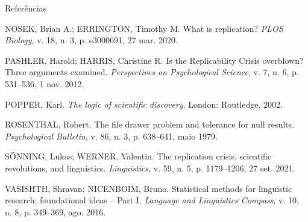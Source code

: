 \documentclass[numbering=fraction,aspectratio=169]{beamer}
\begin{document}
\begin{frame}[allowframebreaks]{Referências}
\begin{thebibliography}{9}
    NOSEK, Brian A.; ERRINGTON, Timothy M. What is replication? \emph{PLOS Biology}, v. 18, n. 3, p. e3000691, 27 mar. 2020.

    PASHLER, Harold; HARRIS, Christine R. Is the Replicability Crisis overblown? Three arguments examined. \emph{Perspectives on Psychological Science}, v. 7, n. 6, p. 531–536, 1 nov. 2012.

    POPPER, Karl. \emph{The logic of scientific discovery}. London: Routledge, 2002.

    ROSENTHAL, Robert. The file drawer problem and tolerance for null results. \emph{Psychological Bulletin}, v. 86, n. 3, p. 638–641, maio 1979.

    SÖNNING, Lukas; WERNER, Valentin. The replication crisis, scientific revolutions, and linguistics. \emph{Linguistics}, v. 59, n. 5, p. 1179–1206, 27 set. 2021.

    VASISHTH, Shravan; NICENBOIM, Bruno. Statistical methods for linguistic research: foundational ideas – Part I. \emph{Language and Linguistics Compass}, v. 10, n. 8, p. 349–369, ago. 2016.

  \end{thebibliography}
\end{frame}
\end{document}
